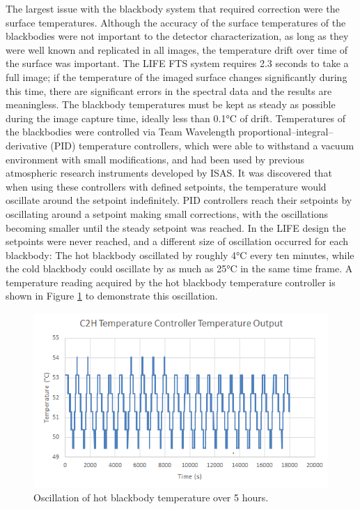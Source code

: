 The largest issue with the blackbody system that required correction were the surface temperatures. Although the accuracy of the surface temperatures of the blackbodies were not important to the detector characterization, as long as they were well known and replicated in all images, the temperature drift over time of the surface was important. The LIFE FTS system requires 2.3 seconds to take a full image; if the temperature of the imaged surface changes significantly during this time, there are significant errors in the spectral data and the results are meaningless. The blackbody temperatures must be kept as steady as possible during the image capture time, ideally less than 0.1°C of drift. Temperatures of the blackbodies were controlled via Team Wavelength proportional–integral–derivative (PID) temperature controllers, which were able to withstand a vacuum environment with small modifications, and had been used by previous atmospheric research instruments developed by ISAS. It was discovered that when using these controllers with defined setpoints, the temperature would oscillate around the setpoint indefinitely. PID controllers reach their setpoints by oscillating around a setpoint making small corrections, with the oscillations becoming smaller until the steady setpoint was reached. In the LIFE design the setpoints were never reached, and a different size of oscillation occurred for each blackbody: The hot blackbody oscillated by roughly 4°C every ten minutes, while the cold blackbody could oscillate by as much as 25°C in the same time frame. A temperature reading acquired by the hot blackbody temperature controller is shown in Figure \ref{fig:C2H_temp_oscillation} to demonstrate this oscillation.

\begin{figure}
    \centering
    \includegraphics{chap3_images/C2H_temperature_oscillation_excel.png}
    \caption{Oscillation of hot blackbody temperature over 5 hours.}
    \label{fig:C2H_temp_oscillation}
\end{figure}

